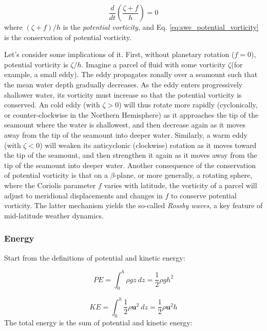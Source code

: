 \documentclass[12pt]{article}
\numberwithin{equation}{section}
\numberwithin{figure}{section}
\numberwithin{table}{section}
\begin{document}
\begin{equation}
  \frac{d}{dt} \left( \frac{\zeta + f}{h} \right) = 0
  \label{eq:swe_potential_vorticity}
\end{equation}
where $(\zeta + f)/h$ is the \textit{potential vorticity},
and Eq. \ref{eq:swe_potential_vorticity} is the conservation of potential
vorticity.

Let's consider some implications of it.
First, without planetary rotation ($f = 0$), potential vorticity is $\zeta/h$.
Imagine a parcel of fluid with some vorticity $\zeta $(for example, a small eddy).
The eddy propagates zonally over a seamount such that the mean water depth
gradually decreases.
As the eddy enters progressively shallower water, its vorticity must increase
so that the potential vorticity is conserved.
An cold eddy (with $\zeta > 0$) will thus rotate more rapidly (cyclonically, or
counter-clockwise in the Northern Hemisphere) as it approaches the tip of the
seamount where the water is shallowest, and then decrease again as it moves away
from the tip of the seamount into deeper water.
Similarly, a warm eddy (with $\zeta < 0$) will weaken its anticyclonic (clockwise)
rotation as it moves toward the tip of the seamount, and then strengthen it again
as it moves away from the tip of the seamount into deeper water.
Another consequence of the conservation of potential vorticity is that on a
$\beta$-plane, or more generally, a rotating sphere, where the Coriolis
parameter $f$ varies with latitude, the vorticity of a parcel will adjust to
meridional displacements and changes in $f$ to conserve potential vorticity.
The latter mechanism yields the so-called
\textit{Rossby waves}, a key feature of mid-latitude weather
dynamics.

\subsubsection{Energy}

Start from the definitions of potential and kinetic energy:

\begin{equation}
  PE = \int_0^h \rho g z\ dz = \frac{1}{2} \rho g h^2
\end{equation}

\begin{equation}
  KE = \int_0^h \frac{1}{2} \rho \mathbf{u}^2\ dz = \frac{1}{2} \rho \mathbf{u}^2 h
\end{equation}
The total energy is the sum of potential and kinetic energy:
\end{document}
